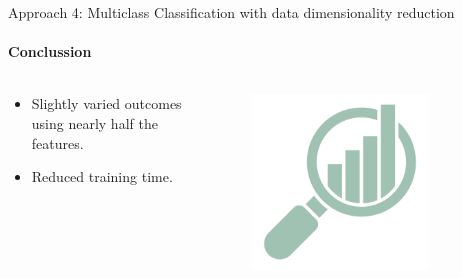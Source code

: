 \documentclass[9pt, pstricks, xcolor=dvipsnames]{beamer}
\begin{document}
\begin{frame}{Approach 4: Multiclass Classification with data dimensionality reduction}
	\framesubtitle{Conclussion}
	\begin{columns}
		\begin{column}{0.5\textwidth}
			\begin{itemize}
				\item Slightly varied outcomes using nearly half the features.
				\item Reduced training time.
			\end{itemize}
		\end{column}
		\begin{column}{0.5\textwidth}
			\begin{figure}
				\centering
				\includegraphics[width=0.8\textwidth]{images/analytics.png}
			\end{figure}
		\end{column}

	\end{columns}
\end{frame}
\end{document}
